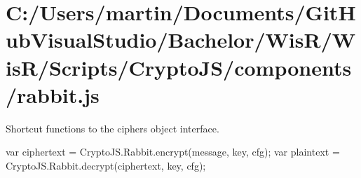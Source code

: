\hypertarget{_c_1_2_users_2martin_2_documents_2_git_hub_visual_studio_2_bachelor_2_wis_r_2_wis_r_2_scripts_2_ceb1bf29ab1bbe291a99a8ab348a650e}{}\section{C\+:/\+Users/martin/\+Documents/\+Git\+Hub\+Visual\+Studio/\+Bachelor/\+Wis\+R/\+Wis\+R/\+Scripts/\+Crypto\+J\+S/components/rabbit.\+js}
Shortcut functions to the cipher\textquotesingle{}s object interface.

\begin{DoxyVerb}var ciphertext = CryptoJS.Rabbit.encrypt(message, key, cfg);
var plaintext  = CryptoJS.Rabbit.decrypt(ciphertext, key, cfg);\end{DoxyVerb}



